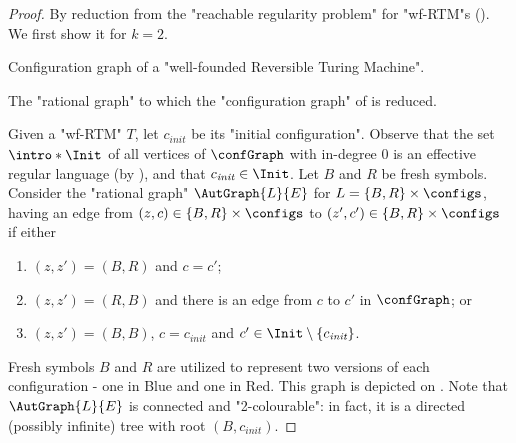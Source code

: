 \begin{proof}%
    By reduction from the "reachable regularity problem" for "wf-RTM"s
    (). We first show it for $k=2$.
    \begin{marginfigure}%
        \centering
        \begin{tikzpicture}
            
        \end{tikzpicture}
        \caption{
            \AP\label{fig:reduction-wf-RTM-to-colouring-config-graph-wf-RTM}
            Configuration graph of a "well-founded Reversible Turing Machine".
        }
    \end{marginfigure}%
    \begin{marginfigure}%
        \centering
        \begin{tikzpicture}
            
        \end{tikzpicture}
        \caption{
            \AP\label{fig:reduction-wf-RTM-to-colouring}
            The "rational graph" to which the "configuration graph"
            of  is reduced.
        }
    \end{marginfigure}%
    \AP Given a "wf-RTM" $T$, let $c_{\textit{init}}$ be its "initial configuration".
    Observe that the set $\intro*\Init$ of all vertices of $\confGraph$ with in-degree $0$ is an effective regular language (by ), and that $c_{\textit{init}} \in \Init$. Let $B$ and $R$ be fresh symbols. 
    Consider the "rational graph" $\AutGraph{L}{E}$ for $L = \set{B,R} \times \configs$, having 
    an edge from $(z,c) \in \{B,R\} \times \configs$ to $(z',c') \in \{B,R\} \times \configs$ if either 
    \begin{enumerate}
        \item $(z,z') = (B,R)$ and $c=c'$;
        \item $(z,z') = (R,B)$ and there is an edge from $c$ to $c'$ in $\confGraph$; or
        \item $(z,z') = (B,B)$, $c = c_{\textit{init}}$ and $c' \in \Init \setminus \set{c_{\textit{init}}}$.
    \end{enumerate}
Fresh symbols $B$ and $R$ are utilized to represent two versions of each configuration - one in Blue and one in Red. This graph is depicted
    on .
    Note that $\AutGraph{L}{E}$ is connected and "2-colourable": in fact, it is a directed (possibly infinite) tree with root $(B,c_{\textit{init}})$. 
    

\end{proof}
